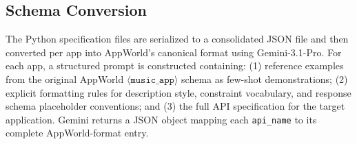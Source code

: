 
\subsection{Schema Conversion}

The Python specification files are serialized to a consolidated JSON file and then converted per app into AppWorld's canonical format using Gemini-3.1-Pro. For each app, a structured prompt is constructed containing: (1) reference examples from the original AppWorld $\langle\mathtt{music\_app}\rangle$ schema as few-shot demonstrations; (2) explicit formatting rules for description style, constraint vocabulary, and response schema placeholder conventions; and (3) the full API specification for the target application. Gemini returns a JSON object mapping each \texttt{api\_name} to its complete AppWorld-format entry.

